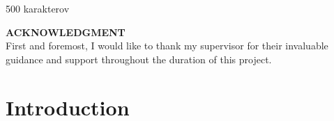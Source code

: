 \documentclass[\myFontSize,oneside,english,hidelinks,a4paper]{article}
\begin{document}
500 karakterov 






\newpage 			%
\setcounter{page}{4}
\vspace*{\fill} 
\noindent \Large \textbf{ACKNOWLEDGMENT}\\
\noindent First and foremost, I would like to thank my supervisor for their invaluable guidance and support throughout the duration of this project.
\vspace*{\fill} 
\vspace{-8cm} 





\newpage{} 
\setcounter{page}{5}
\renewcommand{\contentsname}{Table of Contents}
\tableofcontents



\newpage{}
\listoffigures
\listoftables
\printglossary[type=\acronymtype, title=List of Abbreviations]










\clearpage{} 
\setcounter{page}{1}

\section{Introduction}
\end{document}
